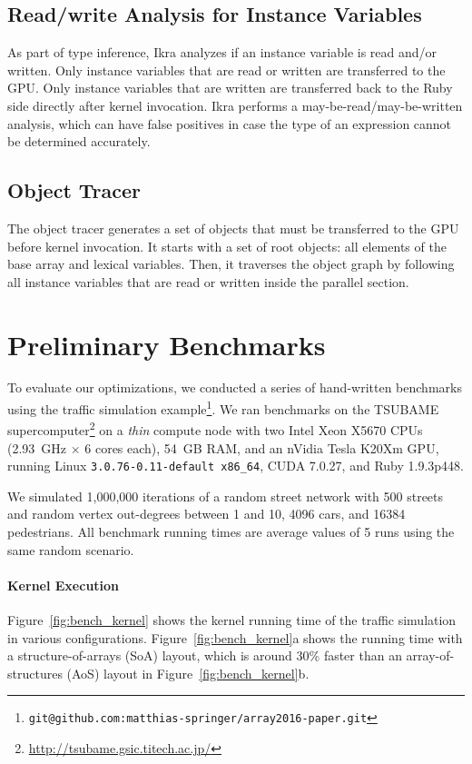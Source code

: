 \documentclass[preprint]{sigplanconf}
\begin{document}
\subsection{Read/write Analysis for Instance Variables}
\label{sec:impl_copyback}
As part of type inference, Ikra analyzes if an instance variable is read and/or written. Only instance variables that are read or written are transferred to the GPU. Only instance variables that are written are transferred back to the Ruby side directly after kernel invocation. Ikra performs a may-be-read/may-be-written analysis, which can have false positives in case the type of an expression cannot be determined accurately.

\subsection{Object Tracer}
\label{sec:impl_tracer}
The object tracer generates a set of objects that must be transferred to the GPU before kernel invocation. It starts with a set of root objects: all elements of the base array and lexical variables. Then, it traverses the object graph by following all instance variables that are read or written inside the parallel section. 

\section{Preliminary Benchmarks}
To evaluate our optimizations, we conducted a series of hand-written benchmarks using the traffic simulation example\footnote{\texttt{git@github.com:matthias-springer/array2016-paper.git}}. We ran benchmarks on the TSUBAME supercomputer\footnote{\url{http://tsubame.gsic.titech.ac.jp/}} on a \emph{thin} compute node with two Intel Xeon X5670 CPUs (2.93~GHz $\times$ 6 cores each), 54~GB RAM, and an nVidia Tesla K20Xm GPU, running Linux \texttt{3.0.76-0.11-default x86\_64}, CUDA 7.0.27, and Ruby 1.9.3p448.

We simulated 1,000,000 iterations of a random street network with 500 streets and random vertex out-degrees between 1 and 10, 4096 cars, and 16384 pedestrians. All benchmark running times are average values of 5 runs using the same random scenario.

\paragraph{Kernel Execution}
Figure~\ref{fig:bench_kernel} shows the kernel running time of the traffic simulation in various configurations. Figure~\ref{fig:bench_kernel}a shows the running time with a structure-of-arrays (SoA) layout, which is around 30\% faster than an array-of-structures (AoS) layout in Figure~\ref{fig:bench_kernel}b.
\end{document}
